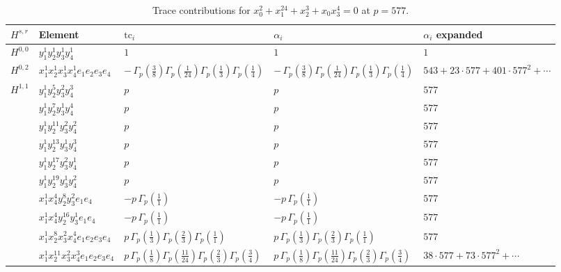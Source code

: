 \documentclass[11pt]{article}
\begin{document}
\begin{table}[ht]
\centering
\caption{Trace contributions for $x_0^{2} + x_1^{24} + x_2^{3} + x_0 x_3^{4} = 0$ at $p=577$.}\label{tab:deformed-60}
\renewcommand{\arraystretch}{1.1}
{\scriptsize
\begin{tabular}{@{}lllll@{}}
\toprule
$H^{s,r}$ & Element & $\mathrm{tc}_i$ & $\alpha_i$ & $\alpha_i$ expanded \\
\midrule
$H^{0,0}$ & $y_{1}^{1} y_{2}^{1} y_{3}^{1} y_{4}^{1}$ & $1$ & $1$ & $1$ \\
\midrule
$H^{0,2}$ & $x_{1}^{1} x_{2}^{1} x_{3}^{1} x_{4}^{1}  e_{1} e_{2} e_{3} e_{4}$ & $- \, \Gamma_p \left( \frac{3}{8} \right) \Gamma_p \left( \frac{1}{24} \right) \Gamma_p \left( \frac{1}{3} \right) \Gamma_p \left( \frac{1}{4} \right)$ & $- \, \Gamma_p \left( \frac{3}{8} \right) \Gamma_p \left( \frac{1}{24} \right) \Gamma_p \left( \frac{1}{3} \right) \Gamma_p \left( \frac{1}{4} \right)$ & $543{+}23{\cdot}577{+}401{\cdot}577^{2}{+}\cdots$ \\
\midrule
$H^{1,1}$ & $y_{1}^{1} y_{2}^{5} y_{3}^{2} y_{4}^{3}$ & $p \,$ & $p \,$ & $577$ \\
 & $y_{1}^{1} y_{2}^{7} y_{3}^{1} y_{4}^{4}$ & $p \,$ & $p \,$ & $577$ \\
 & $y_{1}^{1} y_{2}^{11} y_{3}^{2} y_{4}^{2}$ & $p \,$ & $p \,$ & $577$ \\
 & $y_{1}^{1} y_{2}^{13} y_{3}^{1} y_{4}^{3}$ & $p \,$ & $p \,$ & $577$ \\
 & $y_{1}^{1} y_{2}^{17} y_{3}^{2} y_{4}^{1}$ & $p \,$ & $p \,$ & $577$ \\
 & $y_{1}^{1} y_{2}^{19} y_{3}^{1} y_{4}^{2}$ & $p \,$ & $p \,$ & $577$ \\
 & $x_{1}^{1} x_{4}^{4} y_{2}^{8} y_{3}^{2} e_{1} e_{4}$ & $- p \, \Gamma_p \left( \frac{1}{1} \right)$ & $- p \, \Gamma_p \left( \frac{1}{1} \right)$ & $577$ \\
 & $x_{1}^{1} x_{4}^{4} y_{2}^{16} y_{3}^{1} e_{1} e_{4}$ & $- p \, \Gamma_p \left( \frac{1}{1} \right)$ & $- p \, \Gamma_p \left( \frac{1}{1} \right)$ & $577$ \\
 & $x_{1}^{1} x_{2}^{8} x_{3}^{2} x_{4}^{4}  e_{1} e_{2} e_{3} e_{4}$ & $p \, \Gamma_p \left( \frac{1}{3} \right) \Gamma_p \left( \frac{2}{3} \right) \Gamma_p \left( \frac{1}{1} \right)$ & $p \, \Gamma_p \left( \frac{1}{3} \right) \Gamma_p \left( \frac{2}{3} \right) \Gamma_p \left( \frac{1}{1} \right)$ & $577$ \\
 & $x_{1}^{1} x_{2}^{11} x_{3}^{2} x_{4}^{3}  e_{1} e_{2} e_{3} e_{4}$ & $p \, \Gamma_p \left( \frac{1}{8} \right) \Gamma_p \left( \frac{11}{24} \right) \Gamma_p \left( \frac{2}{3} \right) \Gamma_p \left( \frac{3}{4} \right)$ & $p \, \Gamma_p \left( \frac{1}{8} \right) \Gamma_p \left( \frac{11}{24} \right) \Gamma_p \left( \frac{2}{3} \right) \Gamma_p \left( \frac{3}{4} \right)$ & $38{\cdot}577{+}73{\cdot}577^{2}{+}\cdots$ \\

\end{tabular}}
\end{table}
\end{document}
